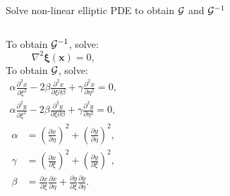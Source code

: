 \documentclass{beamer}
\begin{document}
\begin{frame}{Solve non-linear elliptic PDE to obtain $\mathcal{G}$ and $\mathcal{G}^{-1}$}
\begin{columns}[c]
To obtain $\mathcal{G}^{-1}$, solve:
\tiny
\begin{equation*}
\label{eqn:GInv}
\nabla^2\boldsymbol{\xi}(\mathbf{x}) = 0,
\end{equation*}
\normalsize
To obtain $\mathcal{G}$, solve:
\tiny
\begin{equation*}
	\begin{split}
		\label{eqn:G}
		\alpha\frac{\partial^2x}{\partial\xi^2}-2\beta\frac{\partial^2x}{\partial\xi\partial\beta}+\gamma\frac{\partial^2x}{\partial\eta^2}=0,\\
		\alpha\frac{\partial^2y}{\partial\xi^2}-2\beta\frac{\partial^2y}{\partial\xi\partial\beta}+\gamma\frac{\partial^2y}{\partial\eta^2}=0,
	\end{split}
\end{equation*}
\begin{equation*}
\label{eqn:alphabetagamma}
\begin{split}
\alpha&=\left(\frac{\partial x}{\partial \eta}\right)^2+\left(\frac{\partial y}{\partial \eta}\right)^2,\\
\gamma&=\left(\frac{\partial x}{\partial \xi}\right)^2+\left(\frac{\partial y}{\partial \xi}\right)^2,\\
\beta&=\frac{\partial x}{\partial \xi}\frac{\partial x}{\partial \eta}+\frac{\partial y}{\partial \xi}\frac{\partial y}{\partial \eta}.
\end{split}
\end{equation*}


\end{columns}
\end{frame}
\end{document}
